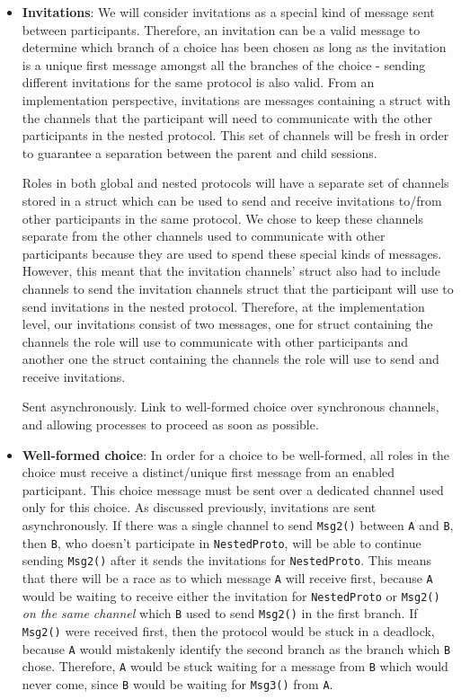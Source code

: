 \documentclass[12pt,twoside]{report}
\begin{document}
\begin{itemize}
    \item \textbf{Invitations}: We will consider invitations as a special kind of message sent between participants. Therefore, an invitation can be a valid message to determine which branch of a choice has been chosen as long as the invitation is a unique first message amongst all the branches of the choice - sending different invitations for the same protocol is also valid. From an implementation perspective, invitations are messages containing a struct with the channels that the participant will need to communicate with the other participants in the nested protocol. This set of channels will be fresh in order to guarantee a separation between the parent and child sessions.

    Roles in both global and nested protocols will have a separate set of channels stored in a struct which can be used to send and receive invitations to/from other participants in the same protocol. We chose to keep these channels separate from the other channels used to communicate with other participants because they are used to spend these special kinds of messages. However, this meant that the invitation channels' struct also had to include channels to send the invitation channels struct that the participant will use to send invitations in the nested protocol. Therefore, at the implementation level, our invitations consist of two messages, one for struct containing the channels the role will use to communicate with other participants and another one the struct containing the channels the role will use to send and receive invitations.
    
    Sent asynchronously. 
    Link to well-formed choice over synchronous channels, and allowing processes to proceed as soon as possible.
    
    \item \textbf{Well-formed choice}: In order for a choice to be well-formed, all roles in the choice must receive a distinct/unique first message from an enabled participant. This choice message must be sent over a dedicated channel used only for this choice. As discussed previously, invitations are sent asynchronously. If there was a single channel to send \texttt{Msg2()} between \texttt{A} and \texttt{B}, then \texttt{B}, who doesn't participate in \texttt{NestedProto}, will be able to continue sending \texttt{Msg2()} after it sends the invitations for \texttt{NestedProto}. This means that there will be a race as to which message \texttt{A} will receive first, because \texttt{A} would be waiting to receive either the invitation for \texttt{NestedProto} or \texttt{Msg2()} \textit{on the same channel} which \texttt{B} used to send \texttt{Msg2()} in the first branch. If \texttt{Msg2()} were received first, then the protocol would be stuck in a deadlock, because \texttt{A} would mistakenly identify the second branch as the branch which \texttt{B} chose. Therefore, \texttt{A} would be stuck waiting for a message from \texttt{B} which would never come, since \texttt{B} would be waiting for \texttt{Msg3()} from \texttt{A}.
    

\end{itemize}
\end{document}
